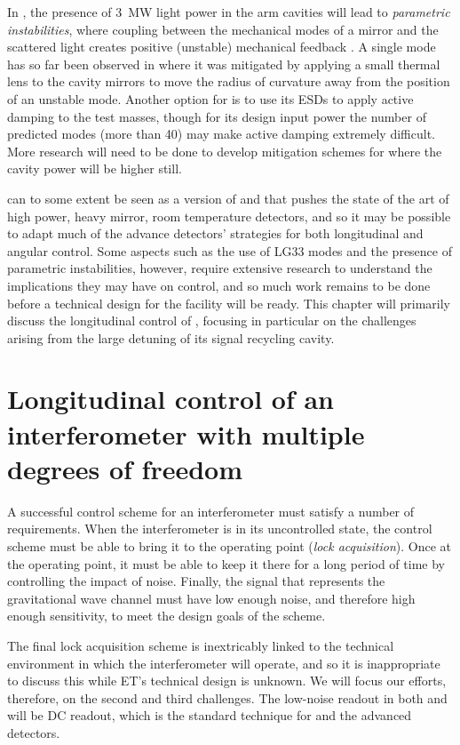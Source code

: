 In \ETHF{}, the presence of \SI{3}{\mega\watt} light power in the arm cavities will lead to \emph{parametric instabilities}, where coupling between the mechanical modes of a mirror and the scattered light creates positive (unstable) mechanical feedback \cite{Braginsky2001}. A single mode has so far been observed in \ALIGO{} \cite{Evans2015} where it was mitigated by applying a small thermal lens to the cavity mirrors to move the radius of curvature away from the position of an unstable mode. Another option for \ALIGO{} is to use its \glspl{ESD} to apply active damping to the test masses, though for its design input power the number of predicted modes (more than 40) may make active damping extremely difficult. More research will need to be done to develop mitigation schemes for \ETHF{} where the cavity power will be higher still.

\ETHF{} can to some extent be seen as a version of \ALIGO{} and \AVIRGO{} that pushes the state of the art of high power, heavy mirror, room temperature detectors, and so it may be possible to adapt much of the advance detectors' strategies for both longitudinal and angular control. Some aspects such as the use of LG33 modes and the presence of parametric instabilities, however, require extensive research to understand the implications they may have on control, and so much work remains to be done before a technical design for the \ET{} facility will be ready. This chapter will primarily discuss the longitudinal control of \ETLF{}, focusing in particular on the challenges arising from the large detuning of its signal recycling cavity.

\section{Longitudinal control of an interferometer with multiple degrees of freedom}
A successful control scheme for an interferometer must satisfy a number of requirements. When the interferometer is in its uncontrolled state, the control scheme must be able to bring it to the operating point (\emph{lock acquisition}). Once at the operating point, it must be able to keep it there for a long period of time by controlling the impact of noise. Finally, the signal that represents the gravitational wave channel must have low enough noise, and therefore high enough sensitivity, to meet the design goals of the scheme.

The final lock acquisition scheme is inextricably linked to the technical environment in which the interferometer will operate, and so it is inappropriate to discuss this while \gls{ET}'s technical design is unknown. We will focus our efforts, therefore, on the second and third challenges. The low-noise readout in both \ETLF{} and \ETHF{} will be \gls{DC} readout, which is the standard technique for \GEOHF{} and the advanced detectors.


